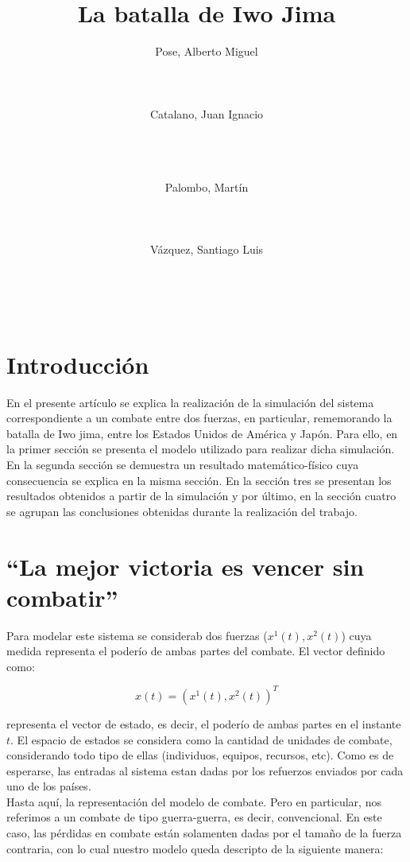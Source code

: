 \documentclass{sig-alternate}
\title{La batalla de Iwo Jima}
\author{
\alignauthor
Pose, Alberto Miguel\\
       \affaddr{ITBA}\\
       \affaddr{Mordor 399}\\
       \affaddr{Buenos Aires, Argentina}\\
       \email{apose@alu.itba.edu.ar}
\alignauthor
Catalano, Juan Ignacio\\
       \affaddr{ITBA}\\
       \affaddr{Madero 399}\\
       \affaddr{Buenos Aires, Argentina}\\
       \email{jcatalan@alu.itba.edu.ar}
\and
\alignauthor 
Palombo, Martín\\
       \affaddr{ITBA}\\
       \affaddr{Madero 399}\\
       \affaddr{Buenos Aires, Argentina}\\
       \email{mpalombo@alu.itba.edu.ar}
\alignauthor 
Vázquez, Santiago Luis\\
       \affaddr{ITBA}\\
       \affaddr{Madero 399}\\
       \affaddr{Buenos Aires, Argentina}\\
       \email{savazque@alu.itba.edu.ar}
}
\date{}
\begin{document}
\maketitle


\newpage

\section{Introducci\'on}

En el presente art\'iculo se explica la realizaci\'on de la simulaci\'on del sistema correspondiente a un combate entre dos fuerzas, 
en particular, rememorando la batalla de Iwo jima, entre los Estados Unidos de Am\'erica y Jap\'on. Para ello, en la primer secci\'on se 
presenta el modelo utilizado para realizar dicha simulaci\'on. En la segunda secci\'on se demuestra un resultado matem\'atico-f\'isico cuya 
consecuencia se explica en la misma secci\'on. En la secci\'on tres se presentan los resultados obtenidos a partir de la simulaci\'on y 
por \'ultimo, en la secci\'on cuatro se agrupan las conclusiones obtenidas durante la realizaci\'on del trabajo.

\section{``La mejor victoria es vencer sin combatir''}
Para modelar este sistema se considerab dos fuerzas ($x^1(t), x^2(t)$) cuya medida representa el poderío de ambas partes del combate. 
El vector definido como:

\begin{equation}
x(t) = ( x^1(t), x^2(t) )^T \label{eq:state_vector}
\end{equation}

representa el vector de estado, es decir, el poderío de ambas partes en el instante $t$. El espacio de estados se considera como la cantidad de 
unidades de combate, considerando todo tipo de ellas (individuos, equipos, recursos, etc). Como es de esperarse, las entradas al sistema estan 
dadas por los refuerzos enviados por cada uno de los países.\\
Hasta aquí, la representación del modelo de combate. Pero en particular, nos referimos a un combate de tipo guerra-guerra, es decir, convencional.
En este caso, las pérdidas en combate están solamenten dadas por el tamaño de la fuerza contraria, con lo cual nuestro modelo queda descripto de la
siguiente manera:
\end{document}
